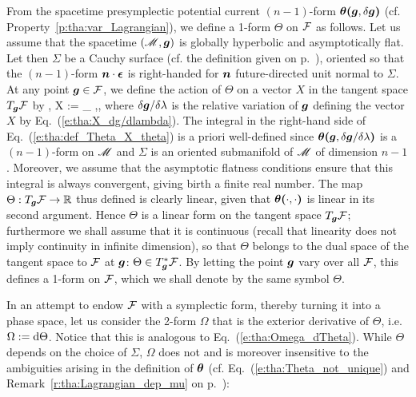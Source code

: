 From the spacetime presymplectic potential current $(n-1)$-form $\bm{\theta}\textbf{(}\bm{g},\delta\bm{g}\textbf{)}$
(cf. Property~\ref{p:tha:var_Lagrangian}), we define a 1-form $\Theta$ on $\mathcal{F}$ as follows.
Let us assume that the spacetime $(\mathscr{M},\bm{g})$ is globally hyperbolic and asymptotically flat.
Let then $\Sigma$ be a Cauchy surface
(cf. the definition given on p.~\pageref{d:sta:Cauchy_surface}), oriented
so that the $(n-1)$-form $\bm{n}\cdot\bm{\epsilon}$ is right-handed for $\bm{n}$ future-directed
unit normal to $\Sigma$.
At any point $\bm{g}\in\mathcal{F}$, we define the action of $\Theta$ on a vector $X$ in the
tangent space $T_{\bm{g}} \mathcal{F}$ by
\be \label{e:tha:def_Theta_X_theta}
    \langle \Theta, X \rangle := \int_{\Sigma} \w{\theta}\Lld{},\Rld ,
\ee
where $\delta\bm{g}/\delta\lambda$ is the relative variation of $\bm{g}$ defining the
vector $X$ by Eq.~(\ref{e:tha:X_dg/dlambda}).
The integral in the right-hand side of Eq.~(\ref{e:tha:def_Theta_X_theta}) is a priori well-defined
since $\bm{\theta}\textbf{(}\bm{g},\delta\bm{g}/\delta\lambda\textbf{)}$ is a $(n-1)$-form on $\mathscr{M}$ and $\Sigma$
is an oriented submanifold of $\mathscr{M}$ of dimension $n-1$. Moreover, we assume that the asymptotic flatness conditions
ensure that this integral is always convergent, giving birth a finite real number.
The map $\Theta: T_{\bm{g}} \mathcal{F} \to \mathbb{R}$ thus defined is clearly linear, given that
$\bm{\theta}\textbf{(}\cdot,\cdot\textbf{)}$ is linear in its second argument.
Hence $\Theta$ is a linear form on the tangent space $T_{\bm{g}} \mathcal{F}$; furthermore we shall assume
that it is continuous (recall that linearity does not imply continuity in infinite dimension),
so that $\Theta$ belongs to the dual space of the tangent space to $\mathcal{F}$ at $\bm{g}$:
$\Theta \in T_{\bm{g}}^* \mathcal{F}$. By letting the point $\bm{g}$ vary over all $\mathcal{F}$, this defines
a 1-form on $\mathcal{F}$, which we shall denote by the same symbol $\Theta$.

In an attempt to endow $\mathcal{F}$ with a symplectic form, thereby turning it into a phase space,
let us consider the 2-form $\Omega$ that is the exterior derivative of $\Theta$,
i.e. $\Omega := \mathrm{d} \Theta$. Notice that this is analogous to Eq.~(\ref{e:tha:Omega_dTheta}).
While $\Theta$ depends on the choice of $\Sigma$, $\Omega$ does not and is moreover
insensitive to the ambiguities arising in the definition of $\bm{\theta}$
(cf. Eq.~(\ref{e:tha:Theta_not_unique}) and Remark~\ref{r:tha:Lagrangian_dep_mu} on
p.~\pageref{r:tha:Lagrangian_dep_mu}):

